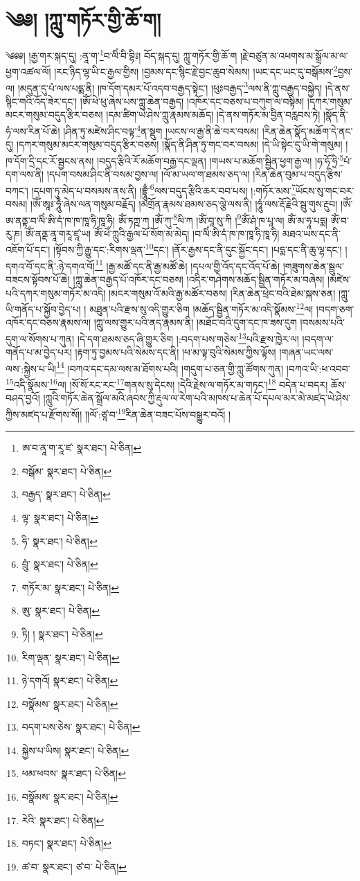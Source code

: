 \setcounter{footnote}{0} 
\chapter{༄༅། །ཀླུ་གཏོར་གྱི་ཆོ་ག།}༄༅༅། །རྒྱ་གར་སྐད་དུ། :ནཱ་ག་\footnote{ཨ་བ་ནཱ་ག་རཱ་ཛ་  སྣར་ཐང་།  པེ་ཅིན། }བ་ལིཾ་བི་བྷིཿ། བོད་སྐད་དུ། ཀླུ་གཏོར་གྱི་ཆོ་ག །རྗེ་བཙུན་མ་འཕགས་མ་སྒྲོལ་མ་ལ་ཕྱག་འཚལ་ལོ། །རང་ཉིད་ལྷ་ཡི་ང་རྒྱལ་གྱིས། །བྱམས་དང་སྙིང་རྗེ་བྱང་ཆུབ་སེམས། །ཡང་དང་ཡང་དུ་བསྒོམས་\footnote{བསྒོམ་  སྣར་ཐང་།  པེ་ཅིན། }བྱས་ལ། །མདུན་དུ་པཾ་ལས་པདྨ་ནི། །ཁ་དོག་དམར་པོ་འདབ་བརྒྱད་སྟེང་། །ཕུཿབརྒྱད་\footnote{བརྒྱད་  སྣར་ཐང་།  པེ་ཅིན། }ལས་ནི་ཀླུ་བརྒྱད་བསྐྱེད། །དེ་ནས་སྙིང་གའི་འོད་ཟེར་དང་། །ཨོཾ་ཕེ་ཕུ་ཞེས་པས་ཀླུ་ཆེན་བརྒྱད། །འཁོར་དང་བཅས་པ་བཀུག་ལ་བསྟིམ། །དཀར་གསུམ་མངར་གསུམ་བདུད་རྩིར་བཅས། །དམ་ཚིག་ཡེ་ཤེས་ཀླུ་རྣམས་མཆོད། །དེ་ནས་གཏོར་མ་བྱིན་བརླབས་ཏེ། །སྣོད་ནི་ཧཾ་ལས་རིན་པོ་ཆེ། །ཤིན་ཏུ་མཛེས་ཤིང་བལྟ་\footnote{ལྟ་  སྣར་ཐང་།  པེ་ཅིན། }ན་སྡུག །ཡངས་ལ་རྒྱ་ནི་ཆེ་བར་བསམ། །རིན་ཆེན་སྣོད་མཆོག་དེ་ནང་དུ། །དཀར་གསུམ་མངར་གསུམ་བདུད་རྩིར་བཅས། །སྣོད་ནི་ཤིན་ཏུ་གང་བར་བསམ། །དེ་ཡི་སྟེང་དུ་ཡི་གེ་གསུམ། །ཁ་དོག་དྲི་དང་རོ་སྦྱངས་ནས། །བདུད་རྩིའི་རོ་མཆོག་བརྒྱ་དང་ལྡན། །གཡས་པ་མཆོག་སྦྱིན་ཕྱག་རྒྱ་ལ། །ཧ་ཧོ་ཧྲི་\footnote{ཧི་  སྣར་ཐང་།  པེ་ཅིན། }པཾ་དག་ལས་ནི། །དཔག་བསམ་ཤིང་ནི་བསམ་བྱས་ལ། །ལོ་མ་ཡལ་ག་ཐམས་ཅད་ལ། །རིན་ཆེན་བུམ་པ་བདུད་རྩིས་བཀང་། །དཔག་ཏུ་མེད་པ་བསམས་ནས་ནི། །བྷྲཱུྃ་\footnote{བྲུཾ་  སྣར་ཐང་།  པེ་ཅིན། }ལས་བདུད་རྩིའི་ཆར་བབ་པས། །:གཏོར་མས་\footnote{གཏོར་མ་  སྣར་ཐང་།  པེ་ཅིན། }ཡོངས་སུ་གང་བར་བསམ། །ཨོཾ་ཨཱཿ་ཧཱུྃ་ཞེས་ལན་གསུམ་བརྗོད། །མགྲོན་རྣམས་ཐམས་ཅད་ལྕེ་ལས་ནི། །ཧཱུཾ་ལས་རྡོ་རྗེའི་སྦུ་གུས་རྔུབ། །ཨོཾ་ཨ་ནནྟ་བ་ལིཾ་ཨི་དཾ་ཁ་ཁ་ཁཱ་ཧི་ཁཱ་ཧི། ཨོཾ་ཏཀྵ་ཀ །ཨོཾ་ཀུ་\footnote{ཨུ་  སྣར་ཐང་།  པེ་ཅིན། }ལི་ཀ །ཨོཾ་བཱ་སུ་ཀི །\footnote{ཏི། །  སྣར་ཐང་།  པེ་ཅིན། }ཨོཾ་ཤཾ་ཁ་པཱ་ལ། ཨོཾ་མ་ཧཱ་པདྨ། ཨོཾ་བ་རུ་ཎ། ཨོཾ་ནནྡ་ནཱ་གརཱ་ཛཱ་ཡ། ཨོཾ་ཕེཾ་ཀླུའི་རྒྱལ་པོ་སོག་མ་མེད། །བ་ལིཾ་ཨི་དཾ་ཁ་ཁ་ཁཱ་ཧི་ཁཱ་ཧི། མཐའ་ཡས་དང་ནི་འཇོག་པོ་དང་། །སྟོབས་ཀྱི་རྒྱུ་དང་:རིགས་ལྡན་\footnote{རིག་ལྡན་  སྣར་ཐང་།  པེ་ཅིན། }དང་། །ནོར་རྒྱས་དང་ནི་དུང་སྐྱོང་དང་། །པདྨ་དང་ནི་ཆུ་ལྷ་དང་། །དགའ་བོ་དང་ནི་:ཉེ་དགའ་བོ།\footnote{ཉེ་དགའོ།  སྣར་ཐང་།  པེ་ཅིན། } །རྒྱ་མཚོ་དང་ནི་རྒྱ་མཚོ་ཆེ། །དཔལ་གྱི་འོད་དང་འོད་པོ་ཆེ། །གཟུགས་ཆེན་སྦྲུལ་བཟངས་སྟོབས་པོ་ཆེ། །ཀླུ་ཆེན་བརྒྱད་པོ་འཁོར་དང་བཅས། །འདིར་གཤེགས་མཆོད་སྦྱིན་གཏོར་མ་བཞེས། །མཛེས་པའི་དཀར་གསུམ་གཏོར་མ་འདི། །མངར་གསུམ་འོ་མའི་རྒྱ་མཚོར་བཅས། །རིན་ཆེན་ཕྲེང་བའི་ཐེམ་སྐས་ཅན། །ཀླུ་ཡི་གནོད་པ་སྐྱོབ་བྱེད་པ། །
མཐུན་པའི་རྫས་སུ་འདི་གྱུར་ཅིག །མཆོད་སྦྱིན་གཏོར་མ་འདི་སྣོམས་\footnote{བསྣོམས་  སྣར་ཐང་།  པེ་ཅིན། }ལ། །བདག་ཅག་འཁོར་དང་བཅས་རྣམས་ལ། །ཀླུ་ལས་གྱུར་པའི་ནད་རྣམས་ནི། །མཐོང་བའི་དུག་དང་ཁ་ཟས་དུག །བསམས་པའི་དུག་ལ་སོགས་པ་ཀུན། །དེ་དག་ཐམས་ཅད་ཞི་གྱུར་ཅིག །:བདག་པས་གཅེས་\footnote{བདག་པས་ཅེས་  སྣར་ཐང་།  པེ་ཅིན། }པའི་རྫས་ཁྱེར་ལ། །བདག་ལ་གནོད་པ་མ་བྱེད་པར། །རྟག་ཏུ་བྱམས་པའི་སེམས་དང་ནི། །ཕ་མ་ལྟ་བུའི་སེམས་ཀྱིས་ལྟོས། །གཞན་ཡང་ལས་ལས་:སྐྱེས་པ་ཡི།\footnote{སྐྱེས་པ་ཡིས།  སྣར་ཐང་།  པེ་ཅིན། } །བཀའ་དང་དམ་ལས་མ་ཐོགས་པའི། །གདུག་པ་ཅན་གྱི་ཀླུ་ཚོགས་ཀུན། །བཀའ་ཡི་:ཕ་འབབ་\footnote{ཕམ་ཕབས་  སྣར་ཐང་།  པེ་ཅིན། }འདི་སྣོམས་\footnote{བསྣོམས་  སྣར་ཐང་།  པེ་ཅིན། }ལ། །སོ་སོ་རང་རང་\footnote{རེའི་  སྣར་ཐང་།  པེ་ཅིན། }གནས་སུ་དེངས། །དེའི་རྗེས་ལ་གཏོར་མ་གཏང་།\footnote{བཏང་།  སྣར་ཐང་།  པེ་ཅིན། } བདེན་པ་བདར། ཆོས་བཤད་བྱའོ། །ཀླུའི་གཏོར་ཆེན་སྒྲོལ་མའི་ཞབས་ཀྱི་རྡུལ་ལ་རེག་པའི་མཁས་པ་ཆེན་པོ་དཔལ་མར་མེ་མཛད་ཡེ་ཤེས་ཀྱིས་མཛད་པ་རྫོགས་སོ།། །།ལོ་:ཙཱ་བ་\footnote{ཚ་བ་  སྣར་ཐང་། ཙ་བ་  པེ་ཅིན། }རིན་ཆེན་བཟང་པོས་བསྒྱུར་བའོ། ། 